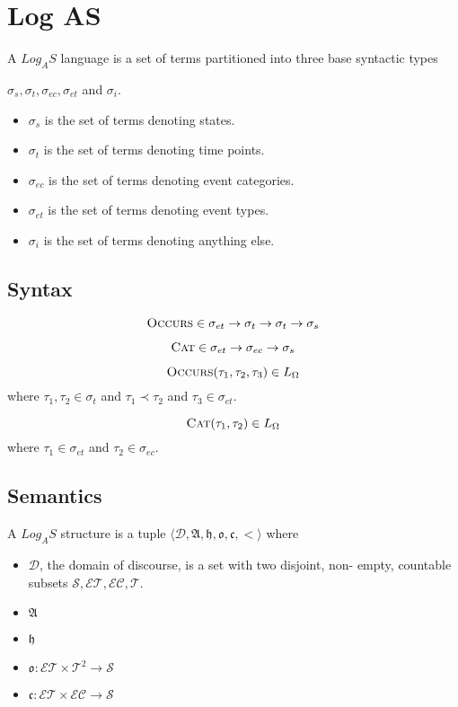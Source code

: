 \chapter{Log AS}

A $Log_A S$ language is a set of terms partitioned into three base syntactic types

$\sigma_s, \sigma_t, \sigma_{ec}, \sigma_{et}$ and $ \sigma_i$.

\begin{itemize}
	\item $\sigma_s$ is the set of terms denoting states.
	\item $\sigma_t$ is the set of terms denoting time points.
	\item $\sigma_{ec}$ is the set of terms denoting event categories.
	\item $\sigma_{et}$ is the set of terms denoting event types.
	\item $\sigma_i$ is the set of terms denoting anything else.
\end{itemize}


\section{Syntax}
\[
	\textsc{Occurs} \in \sigma_{et} \to \sigma_t \to \sigma_t \to \sigma_s
\]

\[
	\textsc{Cat} \in \sigma_{et} \to \sigma_{ec} \to \sigma_s
\]

\[
	\textsc{Occurs}(\tau_1, \tau_2, \tau_3) \in L_{\Omega}
\]
where $\tau_1, \tau_2 \in \sigma_t$ and $\tau_1 \prec \tau_2$ and $\tau_3 \in \sigma_{et}$.

\[
	\textsc{Cat}(\tau_1, \tau_2) \in L_{\Omega}
\]
where $\tau_1 \in \sigma_{et}$ and $\tau_2 \in \sigma_{ec}$.

\pagebreak
\section{Semantics}

\begin{defn}
	A $Log_AS$ structure is a tuple $\langle \mathcal{D},\mathfrak{A}, \mathfrak{h}, \mathfrak{o}, \mathfrak{c}, <
		\rangle$ where
\end{defn}

\begin{itemize}
	\item $\mathcal{D}$,  the domain of discourse, is a set with two disjoint, non-
	      empty, countable subsets $\mathcal{S} , \mathcal{ET}, \mathcal{EC},  \mathcal{T}$.
	\item $\mathfrak{A}$

	\item $\mathfrak{h}$

	\item $\mathfrak{o} : \mathcal{ET} \times \mathcal{T}^2 \to \mathcal{S}$
	\item $\mathfrak{c} : \mathcal{ET} \times \mathcal{EC} \to \mathcal{S}$
\end{itemize}


